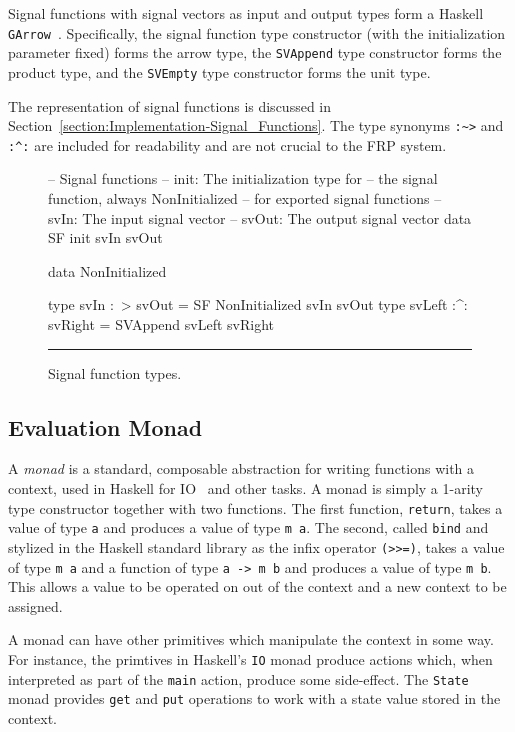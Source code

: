 Signal functions with signal vectors as input and output types form a
Haskell {\tt GArrow}~\cite{Megacz2011}. Specifically, the signal function
type constructor (with the initialization parameter fixed) forms the arrow
type, the {\tt SVAppend} type constructor forms the product type, and the
{\tt SVEmpty} type constructor forms the unit type.

The representation of signal functions is discussed in
Section~\ref{section:Implementation-Signal_Functions}. The type synonyms
{\tt :\textasciitilde>} and {\tt :\textasciicircum:} are included for
readability and are not crucial to the FRP system.

\begin{figure}
\begin{code}
-- Signal functions
-- init: The initialization type for 
--   the signal function, always NonInitialized
--   for exported signal functions
-- svIn: The input signal vector
-- svOut: The output signal vector
data SF init svIn svOut

data NonInitialized

type svIn :~> svOut = SF NonInitialized svIn svOut
type svLeft :^: svRight = SVAppend svLeft svRight
\end{code}
\hrule
\caption{Signal function types.}
\label{figure:signal_function_types}
\end{figure}

\subsection{Evaluation Monad}
\label{section:System_Design_and_Interface-Types-Evaluation_Monad}

A {\em monad} is a standard, composable abstraction for writing functions with
a context, used in Haskell for IO~\cite{PeytonJones1993,PeytonJones2001} and
other tasks. A monad is simply a 1-arity type constructor together with two
functions. The first function, {\tt return}, takes a value of type {\tt a} and
produces a value of type {\tt m a}. The second, called {\tt bind} and stylized
in the Haskell standard library as the infix operator {\tt (>>=)}, takes a value
of type {\tt m a} and a function of type {\tt a -> m b} and produces a value of
type {\tt m b}. This allows a value to be operated on out of the context and a
new context to be assigned.

A monad can have other primitives which manipulate the context in some way. For 
instance, the primtives in Haskell's {\tt IO} monad produce actions which, when
interpreted as part of the {\tt main} action, produce some side-effect. The
{\tt State} monad provides {\tt get} and {\tt put} operations to work with a 
state value stored in the context.

